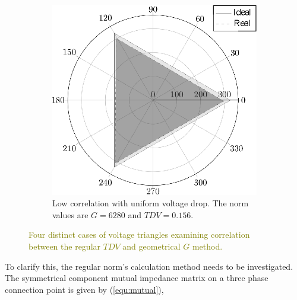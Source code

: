\begin{figure}
\begin{subfigure}[b]{0.48\textwidth}
                    \includegraphics[width=\textwidth]{Unblance_EPS_Pics/EPS_images/circle.eps}
                    \caption{\centering Low correlation with uniform voltage drop. The norm values are $G=6280$ and $TDV=0.156$.}
                    \label{fig:cases_D}
                \end{subfigure}


                \caption{\textcolor{olive}{Four distinct cases of voltage triangles examining correlation between the regular $TDV$ and geometrical $G$ method.}}\label{fig:cases}
            \end{figure}

To clarify this, the regular norm's calculation method needs to be investigated. The symmetrical component mutual impedance matrix on a three phase connection point is given by (\ref{equ:mutual}),

